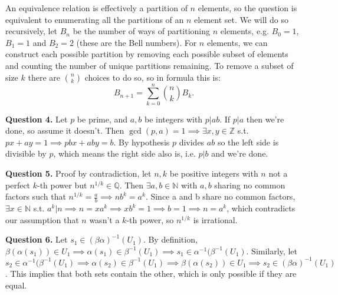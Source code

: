 \documentclass[letterpaper, reqno,11pt]{article}
\begin{document}
An equivalence relation is effectively a partition of $n$ elements, so the question is equivalent to enumerating all the partitions of an $n$ element set. We will do so recursively, let $B_n$ be the number of ways of partitioning $n$ elements, e.g. $B_0=1$, $B_1=1$ and $B_2=2$ (these are the Bell numbers). For $n$ elements, we can construct each possible partition by removing each possible subset of elements and counting the number of unique partitions remaining. To remove a subset of size $k$ there are ${n\choose k}$ choices to do so, so in formula this is:
\[
    B_{n+1}=\sum_{k=0}^{n}{n\choose k}B_k
.\]

{\medskip\noindent\bf Question 4.} Let $p$ be prime, and $a,b$ be integers with $p|ab$. If $p|a$ then we're done, so assume it doesn't. Then $\gcd(p,a)=1\implies\exists x,y\in \mathbb{Z}$ s.t. $px+ay=1\implies pbx+aby=b$. By hypothesis $p$ divides $ab$ so the left side is divisible by $p$, which means the right side also is, i.e. $p|b$ and we're done.

{\medskip\noindent\bf Question 5.} Proof by contradiction, let $n,k$ be positive integers with $n$ not a perfect $k$-th power but $n^{1/k}\in \mathbb{Q}$. Then $\exists a, b\in \mathbb{N}$ with $a, b$ sharing no common factors such that $n^{1 /k}=\frac{a}{b}\implies nb^{k}=a^{k}$. Since a and b share no common factors, $\exists x\in\mathbb{N}$ s.t. $a^{k}|n\implies n=xa^{k}\implies xb^{k}=1\implies b=1\implies n=a^{k}$, which contradicts our assumption that $n$ wasn't a $k$-th power, so $n^{1 /k}$ is irrational.

{\medskip\noindent\bf Question 6.} Let $s_1\in (\beta\alpha)^{-1}(U_1)$. By definition, $\beta(\alpha(s_1))\in U_1\implies \alpha(s_1)\in \beta^{-1}(U_1)\implies s_1\in \alpha ^{-1}(\beta^{-1}(U_1)$. Similarly, let $s_2\in \alpha ^{-1}(\beta^{-1}(U_1)\implies \alpha(s_2)\in \beta^{-1}(U_1)\implies\beta(\alpha(s_2))\in U_1\implies s_2\in (\beta\alpha)^{-1}(U_1)$. This implies that both sets contain the other, which is only possible if they are equal.
\end{document}
